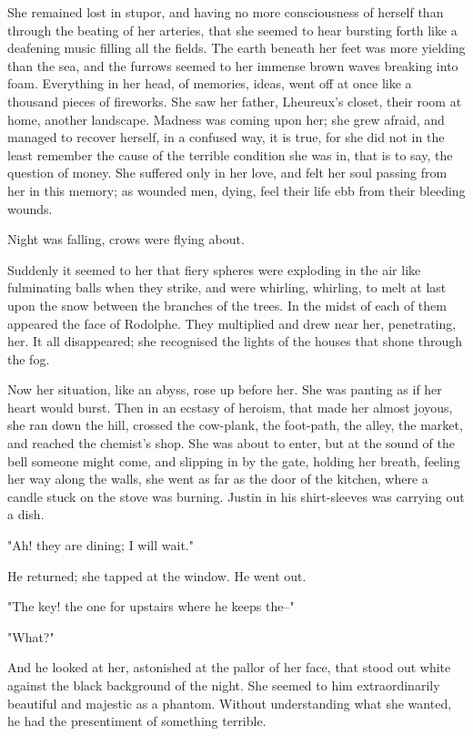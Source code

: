 \documentclass[11pt,twocolumn]{ltugboat}
\begin{document}
She remained lost in stupor, and having no more consciousness of herself
than through the beating of her arteries, that she seemed to hear
bursting forth like a deafening music filling all the fields. The earth
beneath her feet was more yielding than the sea, and the furrows seemed
to her immense brown waves breaking into foam. Everything in her
head, of memories, ideas, went off at once like a thousand pieces of
fireworks. She saw her father, Lheureux's closet, their room at home,
another landscape. Madness was coming upon her; she grew afraid, and
managed to recover herself, in a confused way, it is true, for she did
not in the least remember the cause of the terrible condition she was
in, that is to say, the question of money. She suffered only in her
love, and felt her soul passing from her in this memory; as wounded men,
dying, feel their life ebb from their bleeding wounds.

Night was falling, crows were flying about.

Suddenly it seemed to her that fiery spheres were exploding in the air
like fulminating balls when they strike, and were whirling, whirling,
to melt at last upon the snow between the branches of the trees. In the
midst of each of them appeared the face of Rodolphe. They multiplied and
drew near her, penetrating, her. It all disappeared; she recognised the
lights of the houses that shone through the fog.

Now her situation, like an abyss, rose up before her. She was panting as
if her heart would burst. Then in an ecstasy of heroism, that made
her almost joyous, she ran down the hill, crossed the cow-plank, the
foot-path, the alley, the market, and reached the chemist's shop. She
was about to enter, but at the sound of the bell someone might come, and
slipping in by the gate, holding her breath, feeling her way along the
walls, she went as far as the door of the kitchen, where a candle stuck
on the stove was burning. Justin in his shirt-sleeves was carrying out a
dish.

"Ah! they are dining; I will wait."

He returned; she tapped at the window. He went out.

"The key! the one for upstairs where he keeps the--"

"What?"

And he looked at her, astonished at the pallor of her face, that stood
out white against the black background of the night. She seemed to
him extraordinarily beautiful and majestic as a phantom. Without
understanding what she wanted, he had the presentiment of something
terrible.
\end{document}

